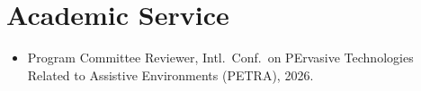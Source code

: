 \section{Academic Service}
\begin{itemize}
  \item Program Committee Reviewer, Intl.\ Conf.\ on PErvasive Technologies Related to
        Assistive Environments (PETRA), 2026.
\end{itemize}
